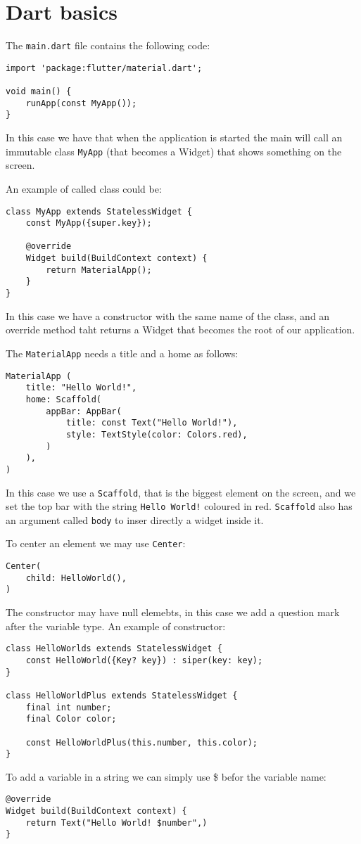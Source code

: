 \section{Dart basics}

The \texttt{main.dart} file contains the following code: 
\begin{lstlisting}[style=Dart]
import 'package:flutter/material.dart';

void main() {
    runApp(const MyApp());
}
\end{lstlisting}
In this case we have that when the application is started the main will call an immutable class \texttt{MyApp} (that becomes a Widget) that shows something on the screen.

An example of called class could be: 
\begin{lstlisting}[style=Dart]
class MyApp extends StatelessWidget {
    const MyApp({super.key}); 

    @override
    Widget build(BuildContext context) {
        return MaterialApp();
    }
}
\end{lstlisting}
In this case we have a constructor with the same name of the class, and an override method taht returns a Widget that becomes the root of our application. 

The \texttt{MaterialApp} needs a title and a home as follows: 
\begin{lstlisting}[style=Dart]
MaterialApp (
    title: "Hello World!",
    home: Scaffold(
        appBar: AppBar(
            title: const Text("Hello World!"),
            style: TextStyle(color: Colors.red),
        )
    ),
)
\end{lstlisting}
In this case we use a \texttt{Scaffold}, that is the biggest element on the screen, and we set the top bar with the string \texttt{Hello World!} coloured in red. 
\texttt{Scaffold} also has an argument called \texttt{body} to inser directly a widget inside it. 

To center an element we may use \texttt{Center}: 
\begin{lstlisting}[style=Dart]
Center( 
    child: HelloWorld(),
)
\end{lstlisting}

The constructor may have null elemebts, in this case we add a question mark after the variable type.
An example of constructor: 
\begin{lstlisting}[style=Dart]
class HelloWorlds extends StatelessWidget {
    const HelloWorld({Key? key}) : siper(key: key);
}

class HelloWorldPlus extends StatelessWidget {
    final int number; 
    final Color color; 

    const HelloWorldPlus(this.number, this.color);
}
\end{lstlisting}
To add a variable in a string we can simply use \$ befor the variable name: 
\begin{lstlisting}[style=Dart]
@override
Widget build(BuildContext context) {
    return Text("Hello World! $number",)
}                               
\end{lstlisting}